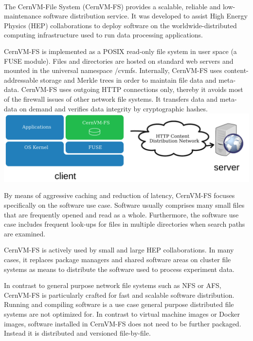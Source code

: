 
\paragraph{}
The CernVM-File System (CernVM-FS) provides a scalable, reliable and low-maintenance software distribution service. It was developed to assist High Energy Physics (HEP) collaborations to deploy software on the worldwide-distributed computing infrastructure used to run data processing applications.
\par
CernVM-FS is implemented as a POSIX read-only file system in user space (a FUSE module). Files and directories are hosted on standard web servers and mounted in the universal namespace /cvmfs. Internally, CernVM-FS uses content-addressable storage and Merkle trees in order to maintain file data and meta-data. CernVM-FS uses outgoing HTTP connections only, thereby it avoids most of the firewall issues of other network file systems. It transfers data and meta-data on demand and verifies data integrity by cryptographic hashes.
\\
\includegraphics[scale=0.27]{figures/overview}
\par
By means of aggressive caching and reduction of latency, CernVM-FS focuses specifically on the software use case. Software usually comprises many small files that are frequently opened and read as a whole. Furthermore, the software use case includes frequent look-ups for files in multiple directories when search paths are examined.
\par
CernVM-FS is actively used by small and large HEP collaborations. In many cases, it replaces package managers and shared software areas on cluster file systems as means to distribute the software used to process experiment data.
\par
In contrast to general purpose network file systems such as NFS or AFS, CernVM-FS is particularly crafted for fast and scalable software distribution. Running and compiling software is a use case general purpose distributed file systems are not optimized for. In contrast to virtual machine images or Docker images, software installed in CernVM-FS does not need to be further packaged. Instead it is distributed and versioned file-by-file.


